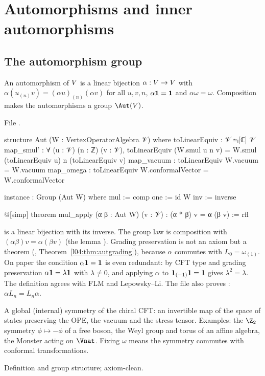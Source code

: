 \section{Automorphisms and inner automorphisms}\label{l04:sec:aut}

\subsection{The automorphism group}

\begin{definition}\label{l04:def:aut}
An automorphism of $V$ is a linear bijection $\alpha:V\to V$ with
$\alpha(u_{(n)}v) = (\alpha u)_{(n)}(\alpha v)$ for all $u,v,n$, $\alpha\mathbf{1} = \mathbf{1}$ and
$\alpha\omega = \omega$. Composition makes the automorphisms a group $\Aut(\lfourV)$.
\end{definition}
\noindent File .
\begin{leancode}
structure Aut (W : VertexOperatorAlgebra 𝒱) where
  toLinearEquiv : 𝒱 ≃ₗ[ℂ] 𝒱
  map_smul' : ∀ (u : 𝒱) (n : ℤ) (v : 𝒱),
    toLinearEquiv (W.smul u n v) = W.smul (toLinearEquiv u) n (toLinearEquiv v)
  map_vacuum : toLinearEquiv W.vacuum = W.vacuum
  map_omega : toLinearEquiv W.conformalVector = W.conformalVector

instance : Group (Aut W) where
  mul := comp
  one := id W
  inv := inverse

@[simp] theorem mul_apply (α β : Aut W) (v : 𝒱) : (α * β) v = α (β v) := rfl
\end{leancode}
\begin{dictionary}
 is a linear bijection with its inverse. The group law is composition with
$(\alpha\beta)v = \alpha(\beta v)$ (the  lemma ). Grading preservation is
not an axiom but a theorem (, Theorem~\ref{l04:thm:autgrading}), because $\alpha$ commutes with $L_0 = \omega_{(1)}$. On paper the
condition $\alpha\mathbf{1} = \mathbf{1}$ is even redundant: by CFT type and grading preservation
$\alpha\mathbf{1} = \lambda\mathbf{1}$ with $\lambda\ne0$, and applying $\alpha$ to $\mathbf{1}_{(-1)}\mathbf{1} = \mathbf{1}$ gives
$\lambda^2 = \lambda$. The definition
agrees with FLM and Lepowsky--Li. The file also proves : $\alpha L_n = L_n\alpha$.
\end{dictionary}
\begin{physics}
A global (internal) symmetry of the chiral CFT: an invertible map of the space of states preserving
the OPE, the vacuum and the stress tensor. Examples: the $\Z_2$ symmetry $\phi\mapsto-\phi$ of a free
boson, the Weyl group and torus of an affine algebra, the Monster acting on $\Vnat$. Fixing $\omega$
means the symmetry commutes with conformal transformations.
\end{physics}
\begin{status}
Definition and group structure; axiom-clean.
\end{status}

